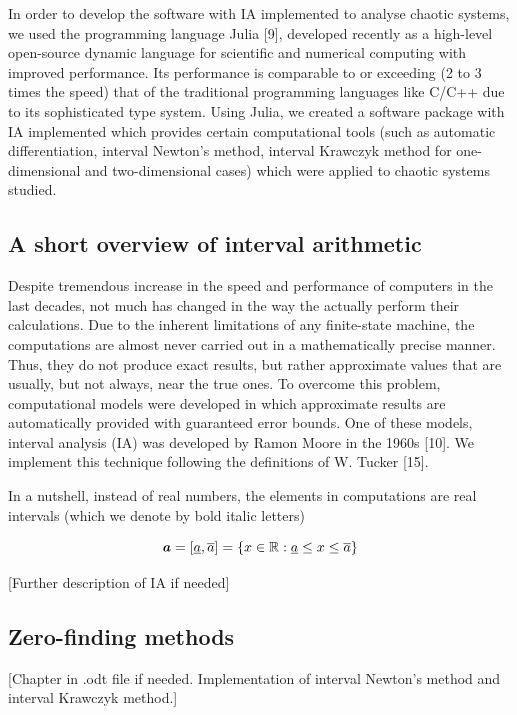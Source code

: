 \documentclass[pre, amsmath, amssymb, onecolumn, showpacs]{revtex4-1}
\begin{document}
In order to develop the software with IA implemented to analyse chaotic systems, we used the programming language Julia [9], developed recently as a high-level open-source dynamic language for scientific and numerical computing with improved performance. Its performance is comparable to or exceeding (2 to 3 times the speed) that of the traditional programming languages like C/C++ due to its sophisticated type system. Using Julia, we created a software package with IA implemented which provides certain computational tools (such as automatic differentiation, interval Newton's method, interval Krawczyk method for one-dimensional and two-dimensional cases) which were applied to chaotic systems studied.


\subsection{A short overview of interval arithmetic}

Despite tremendous increase in the speed and performance of computers in the last decades, not much has changed in the way the actually perform their calculations. Due to the inherent limitations of any finite-state machine, the computations are almost never carried out in a mathematically precise manner. Thus, they do not produce exact results, but rather approximate values that are usually, but not always, near the true ones. To overcome this problem, computational models were developed in which approximate results are automatically provided with guaranteed error bounds. One of these models, interval analysis (IA) was developed by Ramon Moore in the 1960s [10]. We implement this technique following the definitions of W. Tucker [15].

In a nutshell, instead of real numbers, the elements in computations are real intervals (which we denote by bold italic letters)

\begin{equation}
\textbf{\emph{a}} = [\underline{a}, \overline{a}] = \{x \in \mathbb{R}: \underline{a} \leq x \leq \overline{a}\}
\end{equation}


[Further description of IA if needed]


\subsection{Zero-finding methods}

[Chapter in .odt file if needed. Implementation of interval Newton's method and interval Krawczyk method.]
\end{document}
